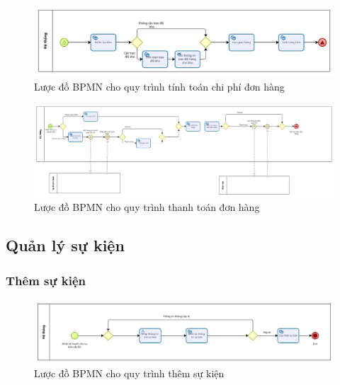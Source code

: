     \begin{figure}[!htp]
        \centering
        \includegraphics[width=5in]{img/BPMN/customer_buy/customer_calc_fee.png}
        \newline
        \caption{Lược đồ BPMN cho quy trình tính toán chi phí đơn hàng}
    \end{figure}
    \begin{figure}[!htp]
        \centering
        \includegraphics[width=15cm]{img/BPMN/customer_buy/customer_payment.png}
        \newline
        \caption{Lược đồ BPMN cho quy trình thanh toán đơn hàng}
    \end{figure}

\subsection{Quản lý sự kiện}

\subsubsection{Thêm sự kiện}

\begin{figure}[!htp]
    \centering
    \includegraphics[width=14cm]{img/BPMN/event/add_event.png}
    \newline
    \caption{Lược đồ BPMN cho quy trình thêm sự kiện}
\end{figure}

